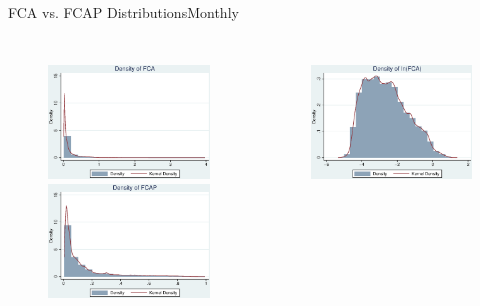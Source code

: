 \documentclass{beamer}
\begin{document}
	
	\begin{frame}{FCA vs. FCAP Distributions}{Monthly}
		\label{Monthly1}
		\begin{columns}
			\begin{figure}
				\centering  
				\includegraphics[width=\linewidth]{"MHistFCA.eps"}\\
				\includegraphics[width=\linewidth]{"MHistFCAP.eps"}
			\end{figure}  
		\pause   
			\begin{figure}
				\centering  
				\includegraphics[width=\linewidth]{"MHistlnFCA.eps"}\\

\end{figure}
\end{columns}
\end{frame}
\end{document}

